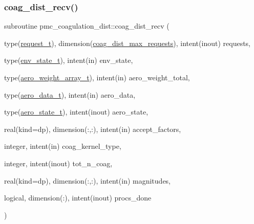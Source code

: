 \subsubsection{\texorpdfstring{coag\+\_\+dist\+\_\+recv()}{coag\_dist\_recv()}}
{\footnotesize\ttfamily subroutine pmc\+\_\+coagulation\+\_\+dist\+::coag\+\_\+dist\+\_\+recv (\begin{DoxyParamCaption}\item[{type(\mbox{\hyperlink{structpmc__coagulation__dist_1_1request__t}{request\+\_\+t}}), dimension(\mbox{\hyperlink{namespacepmc__coagulation__dist_ad7130affac816ec06993cec78d709373}{coag\+\_\+dist\+\_\+max\+\_\+requests}}), intent(inout)}]{requests,  }\item[{type(\mbox{\hyperlink{structpmc__env__state_1_1env__state__t}{env\+\_\+state\+\_\+t}}), intent(in)}]{env\+\_\+state,  }\item[{type(\mbox{\hyperlink{structpmc__aero__weight__array_1_1aero__weight__array__t}{aero\+\_\+weight\+\_\+array\+\_\+t}}), intent(in)}]{aero\+\_\+weight\+\_\+total,  }\item[{type(\mbox{\hyperlink{structpmc__aero__data_1_1aero__data__t}{aero\+\_\+data\+\_\+t}}), intent(in)}]{aero\+\_\+data,  }\item[{type(\mbox{\hyperlink{structpmc__aero__state_1_1aero__state__t}{aero\+\_\+state\+\_\+t}}), intent(inout)}]{aero\+\_\+state,  }\item[{real(kind=dp), dimension(\+:,\+:), intent(in)}]{accept\+\_\+factors,  }\item[{integer, intent(in)}]{coag\+\_\+kernel\+\_\+type,  }\item[{integer, intent(inout)}]{tot\+\_\+n\+\_\+coag,  }\item[{real(kind=dp), dimension(\+:,\+:), intent(in)}]{magnitudes,  }\item[{logical, dimension(\+:), intent(inout)}]{procs\+\_\+done }\end{DoxyParamCaption})}


